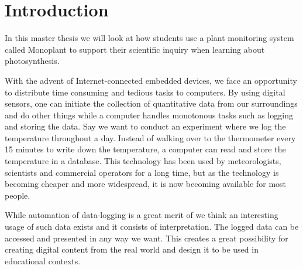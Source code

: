 \setcounter{page}{1}
\chapter{Introduction}
In this master thesis we will look at how students use a plant monitoring system called Monoplant to support their scientific inquiry when learning about photosynthesis. 


With the advent of Internet-connected embedded devices, we face an opportunity to distribute time consuming and tedious tasks to computers. By using digital sensors, one can initiate the collection of quantitative data from our surroundings and do other things while a computer handles monotonous tasks such as logging and storing the data. Say we want to conduct an experiment where we log the temperature throughout a day. Instead of walking over to the thermometer every 15 minutes to write down the temperature, a computer can read and store the temperature in a database. This technology has been used by meteorologists, scientists and commercial operators for a long time, but as the technology is becoming cheaper and more widespread, it is now becoming available for most people. %

While automation of data-logging is a great merit of we think an interesting usage of such data exists and it consists of interpretation. The logged data can be accessed and presented in any way we want. This creates a great possibility for creating digital content from the real world and design it to be used in educational contexts.


